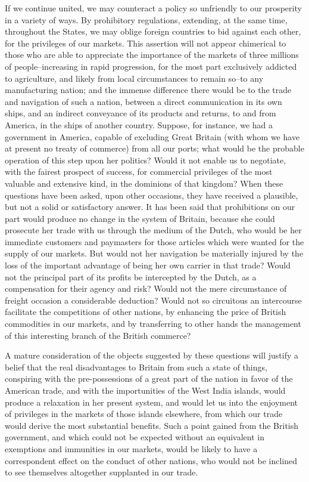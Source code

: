 If we continue united, we may counteract a policy so unfriendly to our prosperity in a variety of ways. By prohibitory regulations, extending, at the same time, throughout the States, we may oblige foreign countries to bid against each other, for the privileges of our markets. This assertion will not appear chimerical to those who are able to appreciate the importance of the markets of three millions of people--increasing in rapid progression, for the most part exclusively addicted to agriculture, and likely from local circumstances to remain so--to any manufacturing nation; and the immense difference there would be to the trade and navigation of such a nation, between a direct communication in its own ships, and an indirect conveyance of its products and returns, to and from America, in the ships of another country. Suppose, for instance, we had a government in America, capable of excluding Great Britain (with whom we have at present no treaty of commerce) from all our ports; what would be the probable operation of this step upon her politics? Would it not enable us to negotiate, with the fairest prospect of success, for commercial privileges of the most valuable and extensive kind, in the dominions of that kingdom? When these questions have been asked, upon other occasions, they have received a plausible, but not a solid or satisfactory answer. It has been said that prohibitions on our part would produce no change in the system of Britain, because she could prosecute her trade with us through the medium of the Dutch, who would be her immediate customers and paymasters for those articles which were wanted for the supply of our markets. But would not her navigation be materially injured by the loss of the important advantage of being her own carrier in that trade? Would not the principal part of its profits be intercepted by the Dutch, as a compensation for their agency and risk? Would not the mere circumstance of freight occasion a considerable deduction? Would not so circuitous an intercourse facilitate the competitions of other nations, by enhancing the price of British commodities in our markets, and by transferring to other hands the management of this interesting branch of the British commerce?

A mature consideration of the objects suggested by these questions will justify a belief that the real disadvantages to Britain from such a state of things, conspiring with the pre-possessions of a great part of the nation in favor of the American trade, and with the importunities of the West India islands, would produce a relaxation in her present system, and would let us into the enjoyment of privileges in the markets of those islands elsewhere, from which our trade would derive the most substantial benefits. Such a point gained from the British government, and which could not be expected without an equivalent in exemptions and immunities in our markets, would be likely to have a correspondent effect on the conduct of other nations, who would not be inclined to see themselves altogether supplanted in our trade.

